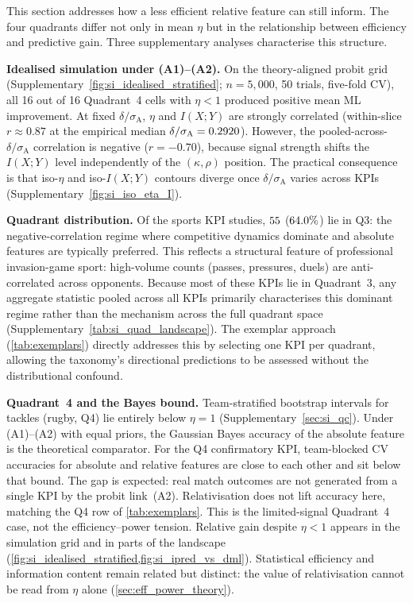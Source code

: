 This section addresses how a less efficient relative feature can still inform. The four quadrants differ not only in mean $\eta$ but in the relationship between efficiency and predictive gain. Three supplementary analyses characterise this structure.

\textbf{Idealised simulation under (A1)--(A2).} On the theory-aligned probit grid (Supplementary~\cref{fig:si_idealised_stratified}; $n=5{,}000$, 50 trials, five-fold CV), all 16 out of 16 Quadrant~4 cells with $\eta<1$ produced positive mean ML improvement. At fixed $\delta/\sigma_{\mathrm{A}}$, $\eta$ and $I(X;Y)$ are strongly correlated (within-slice $r\approx0.87$ at the empirical median $\delta/\sigma_{\mathrm{A}}=0.2920$). However, the pooled-across-$\delta/\sigma_{\mathrm{A}}$ correlation is negative ($r=-0.70$), because signal strength shifts the $I(X;Y)$ level independently of the $(\kappa,\rho)$ position. The practical consequence is that iso-$\eta$ and iso-$I(X;Y)$ contours diverge once $\delta/\sigma_{\mathrm{A}}$ varies across KPIs (Supplementary~\cref{fig:si_iso_eta_I}).

\textbf{Quadrant distribution.} Of the \PEFtotalStudies{} sports KPI studies, $55{}$ ($64.0\%$) lie in Q3: the negative-correlation regime where competitive dynamics dominate and absolute features are typically preferred. This reflects a structural feature of professional invasion-game sport: high-volume counts (passes, pressures, duels) are anti-correlated across opponents. Because most of these KPIs lie in Quadrant~3, any aggregate statistic pooled across all KPIs primarily characterises this dominant regime rather than the mechanism across the full quadrant space (Supplementary~\cref{tab:si_quad_landscape}). The exemplar approach (\cref{tab:exemplars}) directly addresses this by selecting one KPI per quadrant, allowing the taxonomy's directional predictions to be assessed without the distributional confound.

\textbf{Quadrant~4 and the Bayes bound.} Team-stratified bootstrap intervals for tackles (rugby, Q4) lie entirely below $\eta=1$ (Supplementary~\cref{sec:si_qc}). Under (A1)--(A2) with equal priors, the Gaussian Bayes accuracy of the absolute feature is the theoretical comparator. For the Q4 confirmatory KPI, team-blocked CV accuracies for absolute and relative features are close to each other and sit below that bound. The gap is expected: real match outcomes are not generated from a single KPI by the probit link~(A2). Relativisation does not lift accuracy here, matching the Q4 row of \cref{tab:exemplars}. This is the limited-signal Quadrant~4 case, not the efficiency--power tension. Relative gain despite $\eta<1$ appears in the simulation grid and in parts of the landscape (\cref{fig:si_idealised_stratified,fig:si_ipred_vs_dml}). Statistical efficiency and information content remain related but distinct: the value of relativisation cannot be read from $\eta$ alone (\cref{sec:eff_power_theory}).

